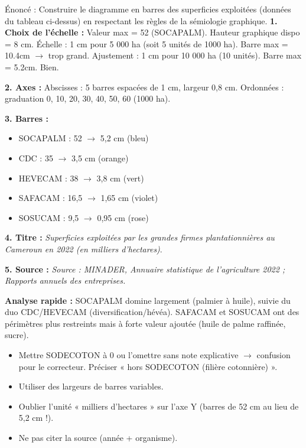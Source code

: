 \documentclass[11pt]{article}
\begin{document}
\begin{exoresolu}
Énoncé : Construire le diagramme en barres des superficies exploitées (données du tableau ci-dessus) en respectant les règles de la sémiologie graphique.
\tcblower
\textbf{1. Choix de l'échelle :} Valeur max = 52 (SOCAPALM). Hauteur graphique dispo = 8 cm. Échelle : 1 cm pour 5 000 ha (soit 5 unités de 1000 ha). Barre max = 10.4cm $\rightarrow$ trop grand. Ajustement : 1 cm pour 10 000 ha (10 unités). Barre max = 5.2cm. Bien.\par
\textbf{2. Axes :} Abscisses : 5 barres espacées de 1 cm, largeur 0,8 cm. Ordonnées : graduation 0, 10, 20, 30, 40, 50, 60 (1000 ha).\par
\textbf{3. Barres :}
\begin{itemize}
    \item SOCAPALM : 52 $\rightarrow$ 5,2 cm (bleu)
    \item CDC : 35 $\rightarrow$ 3,5 cm (orange)
    \item HEVECAM : 38 $\rightarrow$ 3,8 cm (vert)
    \item SAFACAM : 16,5 $\rightarrow$ 1,65 cm (violet)
    \item SOSUCAM : 9,5 $\rightarrow$ 0,95 cm (rose)
\end{itemize}
\textbf{4. Titre :} \emph{Superficies exploitées par les grandes firmes plantationnières au Cameroun en 2022 (en milliers d'hectares)}.\par
\textbf{5. Source :} \emph{Source : MINADER, Annuaire statistique de l'agriculture 2022 ; Rapports annuels des entreprises.}\par
\textbf{Analyse rapide :} SOCAPALM domine largement (palmier à huile), suivie du duo CDC/HEVECAM (diversification/hévéa). SAFACAM et SOSUCAM ont des périmètres plus restreints mais à forte valeur ajoutée (huile de palme raffinée, sucre).
\end{exoresolu}

\begin{attention}
\begin{itemize}
    \item Mettre SODECOTON à 0 ou l'omettre sans note explicative $\rightarrow$ confusion pour le correcteur. Préciser « hors SODECOTON (filière cotonnière) ».
    \item Utiliser des largeurs de barres variables.
    \item Oublier l'unité « milliers d'hectares » sur l'axe Y (barres de 52 cm au lieu de 5,2 cm !).
    \item Ne pas citer la source (année + organisme).
\end{itemize}
\end{attention}
\end{document}
